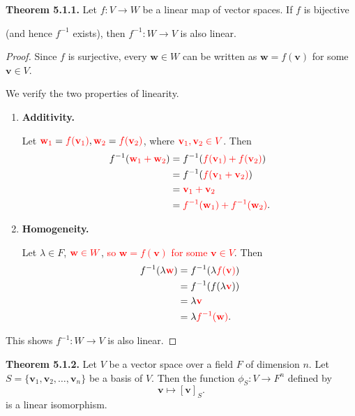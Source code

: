 \documentclass[12pt]{article}
\begin{document}
\textbf{Theorem 5.1.1.}
Let $f:V\to W$ be a linear map of vector spaces. If $f$ is bijective 

(and hence $f^{-1}$ exists), then $f^{-1}:W\to V$ is also linear.

\begin{proof}
Since $f$ is surjective, every $\mathbf{w}\in W$ can be written as $\mathbf{w}=f(\mathbf{v})$ for some $\mathbf{v}\in V$.

We verify the two properties of linearity.

\begin{enumerate}
    \item \textbf{Additivity.}

    Let $\textcolor{red}{\mathbf{w}_1}=\textcolor{red}{f(\mathbf{v}_1)},\textcolor{red}{\mathbf{w}_2}=\textcolor{red}{f(\mathbf{v}_2)}$, where $\textcolor{red}{\mathbf{v}_1,\mathbf{v}_2\in V}$. Then
    \begin{align*}
    f^{-1}(\textcolor{red}{\mathbf{w}_1+\mathbf{w}_2})
        &=f^{-1}\!\left(\textcolor{red}{f(\mathbf{v}_1)+f(\mathbf{v}_2)}\right)\\
        &=f^{-1}\!\left(\textcolor{red}{f(\mathbf{v}_1+\mathbf{v}_2)}\right)\\
        &=\textcolor{red}{\mathbf{v}_1+\mathbf{v}_2}\\
        &=\textcolor{red}{f^{-1}(\mathbf{w}_1)+f^{-1}(\mathbf{w}_2)}.
    \end{align*}
    \item \textbf{Homogeneity.}

    Let $\lambda\in F$, $\textcolor{red}{\mathbf{w} \in W}$, \textcolor{red}{so $\mathbf{w}=f(\mathbf{v})$ for some $\mathbf{v}\in V$}. Then
    \begin{align*}
    f^{-1}(\lambda\textcolor{red}{\mathbf{w}})
        &=f^{-1}(\lambda \textcolor{red}{f(\mathbf{v})})\\
        &=f^{-1}(f(\lambda\textcolor{red}{\mathbf{v}}))\\
        &=\lambda\textcolor{red}{\mathbf{v}}\\
        &=\lambda \textcolor{red}{f^{-1}(\mathbf{w})}.
    \end{align*}
\end{enumerate}

This shows $f^{-1}:W\to V$ is also linear.
\end{proof}

\textbf{Theorem 5.1.2.}
Let $V$ be a vector space over a field $F$ of dimension $n$. Let $S=\{\mathbf{v}_1,\mathbf{v}_2,\ldots,\mathbf{v}_n\}$
be a basis of $V$. Then the function $\phi_S:V\to F^n$ defined by
\[
\mathbf{v}\mapsto[\mathbf{v}]_S.
\]
is a linear isomorphism.
\end{document}
